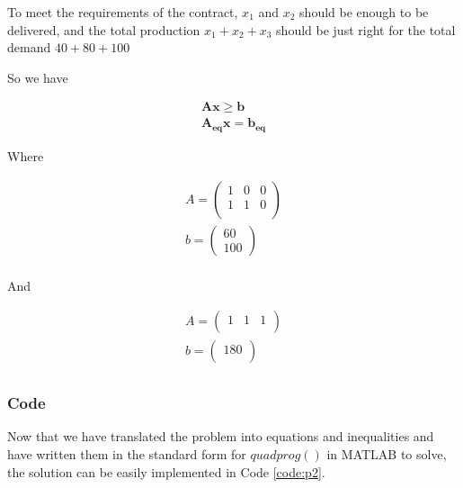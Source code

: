 \documentclass[12pt]{article}
\begin{document}
To meet the requirements of the contract, $x_1$ and $x_2$ should be enough to be delivered, and the total production $x_1+x_2+x_3$ should be just right for the total demand $40+80+100$

So we have

\begin{equation}
	\begin{aligned}
	\mathbf{A} \mathbf{x} \ge \mathbf{b}\\
	\mathbf{A_{eq}} \mathbf{x} = \mathbf{b_{eq}}
	\end{aligned}
\end{equation}

Where

\begin{equation}
\begin{aligned}
	A=\left(   
	\begin{array}{ccc} 
		1 & 0 & 0\\
		1 & 1 & 0\\ 
	\end{array}
	\right) \\
	b=\left(   
	\begin{array}{c} 
		60\\
		100
	\end{array}
	\right) \\
\end{aligned}
\end{equation}

And

\begin{equation}
	\begin{aligned}
		A=\left(   
		\begin{array}{ccc} 
			1 & 1 & 1\\ 
		\end{array}
		\right) \\
		b=\left(   
		\begin{array}{c} 
			180\\
		\end{array}
		\right) \\
	\end{aligned}
\end{equation}

\subsubsection{Code}

Now that we have translated the problem into equations and inequalities and have written them in the standard form for $quadprog()$ in MATLAB to solve, the solution can be easily implemented in Code \ref{code:p2}.
\end{document}
